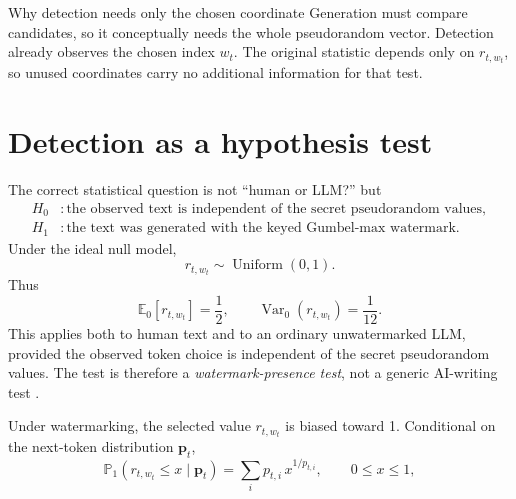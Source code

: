 \documentclass[11pt]{article}
\DeclareRobustCommand{\iperpaper}[2]{%
  \begingroup
  \hypersetup{pdfborder=0 0 0}%
  \href{iperpaper:#1}{{\color{iperpaperlink}#2}}%
  \endgroup
}
\def\iperpaper#1#2{#2}%
\newcommand{\U}{\operatorname{Uniform}}
\newcommand{\E}{\mathbb{E}}
\newcommand{\Pp}{\mathbb{P}}
\newcommand{\Var}{\operatorname{Var}}
\begin{document}
\begin{leveltwo}{Why detection needs only the chosen coordinate}
Generation must compare candidates, so it conceptually needs the whole pseudorandom vector. Detection already observes the chosen index $w_t$. The original statistic depends only on $r_{t,w_t}$, so unused coordinates carry no additional information for that test.
\end{leveltwo}

\section{Detection as a hypothesis test}

The correct statistical question is not ``human or LLM?'' but
\begin{align*}
\iperpaper{null_hypothesis}{H_0} &: \text{the observed text is independent of the secret pseudorandom values},\\
\iperpaper{watermarked_hypothesis}{H_1} &: \text{the text was generated with the keyed Gumbel-max watermark}.
\end{align*}
Under the ideal null model,
\begin{equation}
  \iperpaper{null_selected_value_distribution}{r_{t,w_t}\sim\U(0,1)}.
  \label{eq:nullr}
\end{equation}
Thus
\[
  \E_0[r_{t,w_t}]=\frac12,
  \qquad
  \Var_0(r_{t,w_t})=\frac1{12}.
\]
This applies both to human text and to an ordinary unwatermarked LLM, provided the observed token choice is independent of the secret pseudorandom values. The test is therefore a \emph{watermark-presence test}, not a generic AI-writing test \cite{li2025}.

Under watermarking, the selected value $r_{t,w_t}$ is biased toward 1. Conditional on the next-token distribution $\mathbf p_t$,
\begin{equation}
  \iperpaper{alternative_selected_value_cdf}{\Pp_1(r_{t,w_t}\le x\mid\mathbf p_t)
  =\sum_i p_{t,i}\,x^{1/p_{t,i}}},
  \qquad 0\le x\le1,
  \label{eq:altcdf-main}
\end{equation}
\end{document}

